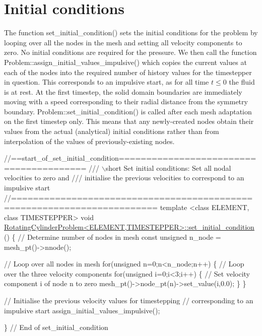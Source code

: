  

\hypertarget{index_set_initial_condition}{}\section{Initial conditions}\label{index_set_initial_condition}
The function {\ttfamily set\+\_\+initial\+\_\+condition()} sets the initial conditions for the problem by looping over all the nodes in the mesh and setting all velocity components to zero. No initial conditions are required for the pressure. We then call the function {\ttfamily Problem\+::assign\+\_\+initial\+\_\+values\+\_\+impulsive()} which copies the current values at each of the nodes into the required number of history values for the timestepper in question. This corresponds to an impulsive start, as for all time $ t \leq 0 $ the fluid is at rest. At the first timestep, the solid domain boundaries are immediately moving with a speed corresponding to their radial distance from the symmetry boundary. {\ttfamily Problem\+::set\+\_\+initial\+\_\+condition()} is called after each mesh adaptation on the first timestep only. This means that any newly-\/created nodes obtain their values from the actual (analytical) initial conditions rather than from interpolation of the values of previously-\/existing nodes.


\begin{DoxyCodeInclude}
\textcolor{comment}{//==start\_of\_set\_initial\_condition========================================}
\textcolor{comment}{/// \(\backslash\)short Set initial conditions: Set all nodal velocities to zero and}
\textcolor{comment}{}\textcolor{comment}{/// initialise the previous velocities to correspond to an impulsive start}
\textcolor{comment}{}\textcolor{comment}{//========================================================================}
\textcolor{keyword}{template} <\textcolor{keyword}{class} ELEMENT, \textcolor{keyword}{class} TIMESTEPPER>
\textcolor{keywordtype}{void} \hyperlink{classRotatingCylinderProblem_a5e4316cce2306c4aab4a20b88cdfe6e3}{RotatingCylinderProblem<ELEMENT,TIMESTEPPER>::set\_initial\_condition}
      ()
\{
 \textcolor{comment}{// Determine number of nodes in mesh}
 \textcolor{keyword}{const} \textcolor{keywordtype}{unsigned} n\_node = mesh\_pt()->nnode();
 
 \textcolor{comment}{// Loop over all nodes in mesh}
 \textcolor{keywordflow}{for}(\textcolor{keywordtype}{unsigned} n=0;n<n\_node;n++)
  \{
   \textcolor{comment}{// Loop over the three velocity components}
   \textcolor{keywordflow}{for}(\textcolor{keywordtype}{unsigned} i=0;i<3;i++)
    \{
     \textcolor{comment}{// Set velocity component i of node n to zero}
     mesh\_pt()->node\_pt(n)->set\_value(i,0.0);
    \}
  \}
 
 \textcolor{comment}{// Initialise the previous velocity values for timestepping}
 \textcolor{comment}{// corresponding to an impulsive start}
 assign\_initial\_values\_impulsive();
 
\} \textcolor{comment}{// End of set\_initial\_condition}

\end{DoxyCodeInclude}




